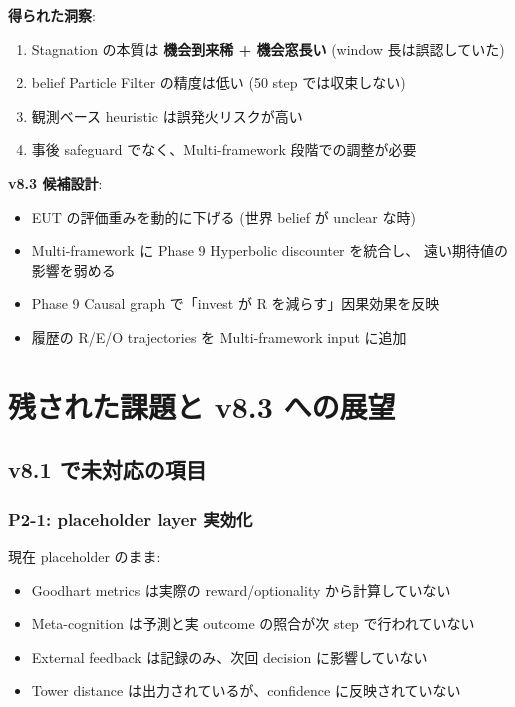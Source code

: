 \documentclass[a4paper,11pt]{report}
\begin{document}
\begin{summary}
\textbf{得られた洞察}:

\begin{enumerate}[leftmargin=*]
  \item Stagnation の本質は \textbf{機会到来稀 + 機会窓長い} (window 長は誤認していた)
  \item belief Particle Filter の精度は低い (50 step では収束しない)
  \item 観測ベース heuristic は誤発火リスクが高い
  \item 事後 safeguard でなく、Multi-framework 段階での調整が必要
\end{enumerate}

\textbf{v8.3 候補設計}:

\begin{itemize}[leftmargin=*]
  \item EUT の評価重みを動的に下げる (世界 belief が unclear な時)
  \item Multi-framework に Phase 9 Hyperbolic discounter を統合し、
        遠い期待値の影響を弱める
  \item Phase 9 Causal graph で「invest が R を減らす」因果効果を反映
  \item 履歴の R/E/O trajectories を Multi-framework input に追加
\end{itemize}
\end{summary}

\chapter{残された課題と v8.3 への展望}

\section{v8.1 で未対応の項目}

\subsection{P2-1: placeholder layer 実効化}

現在 placeholder のまま:
\begin{itemize}[leftmargin=*]
  \item Goodhart metrics は実際の reward/optionality から計算していない
  \item Meta-cognition は予測と実 outcome の照合が次 step で行われていない
  \item External feedback は記録のみ、次回 decision に影響していない
  \item Tower distance は出力されているが、confidence に反映されていない
\end{itemize}
\end{document}
